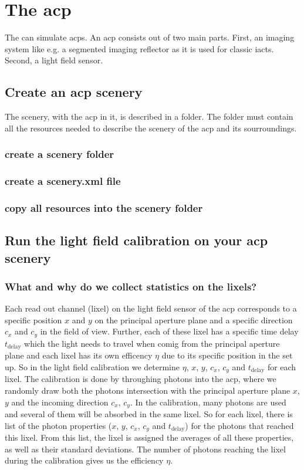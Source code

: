 \chapter{The \acf{acp}}
%
The \tool{} can simulate \acp{acp}.
%
An \ac{acp} consists out of two main parts.
%
First, an imaging system like e.g. a segmented imaging reflector as it is used for classic \acp{iact}.
%
Second, a light field sensor.
%
\section{Create an \ac{acp} scenery}
The scenery, with the \ac{acp} in it, is described in a folder.
%
The folder must contain all the resources needed to describe the scenery of the \ac{acp} and its sourroundings.
%
\subsection{create a scenery folder}
%
\subsection{create a scenery.xml file}
%
\subsection{copy all resources into the scenery folder}
\section{Run the light field calibration on your \ac{acp} scenery}
%
\subsection{What and why do we collect statistics on the lixels?}
%
Each read out channel (lixel) on the light field sensor of the \ac{acp} corresponds to a specific position $x$ and $y$ on the principal aperture plane and a specific direction $c_x$ and $c_y$ in the field of view.
%
Further, each of these lixel has a specific time delay $t_\text{delay}$ which the light needs to travel when comig from the principal aperture plane and each lixel has its own efficency $\eta$ due to its specific position in the set up.
%
So in the light field calibration we determine $\eta$, $x$, $y$, $c_x$, $c_y$ and $t_\text{delay}$ for each lixel.
%
The calibration is done by throughing photons into the \ac{acp}, where we randomly draw both the photons intersection with the principal aperture plane $x$, $y$ and the incoming direction $c_x$, $c_y$.
%
In the calibration, many photons are used and several of them will be absorbed in the same lixel.
%
So for each lixel, there is list of the photon properties ($x$, $y$, $c_x$, $c_y$ and $t_\text{delay}$) for the photons that reached this lixel.
%
From this list, the lixel is assigned the averages of all these properties, as well as their standard deviations.
%
The number of photons reaching the lixel during the calibration gives us the efficiency $\eta$.
%
%

